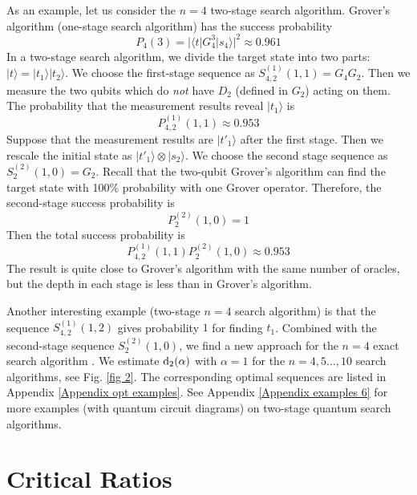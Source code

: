 \documentclass[%
 twocolumn,
 10pt,
 superscriptaddress,
 longbibliography,
 amsmath,amssymb,
 aps,
 pra,
floatfix,
]{revtex4-1}
\begin{document}
As an example, let us consider the $n=4$ two-stage search algorithm. Grover's algorithm (one-stage search algorithm) has the success probability
\begin{equation}
	P_4(3)=|\langle t|G_4^3|s_4\rangle|^2\approx 0.961
\end{equation}
In a two-stage search algorithm, we divide the target state into two parts: $|t\rangle=|t_1\rangle|t_2\rangle$. We choose the first-stage sequence as $S^{(1)}_{4,2}(1,1)=G_4 G_2$. Then we measure the two qubits which do \textit{not} have $D_2$ (defined in $G_2$) acting on them. The probability that the measurement results reveal $|t_1\rangle$ is
\begin{equation}
	P^{(1)}_{4,2}(1,1)\approx 0.953
\end{equation}
Suppose that the measurement results are $|t'_1\rangle$ after the first stage. Then we rescale the initial state as $|t'_1\rangle\otimes|s_2\rangle$. We choose the second stage sequence as $S^{(2)}_{2}(1,0)=G_2$. Recall that the two-qubit Grover's algorithm can find the target state with 100\% probability with one Grover operator. Therefore, the second-stage success probability is
\begin{equation}
	P^{(2)}_{2}(1,0)=1
\end{equation}
Then the total success probability is
\begin{equation}
	P^{(1)}_{4,2}(1,1)P^{(2)}_{2}(1,0)\approx 0.953
\end{equation}
The result is quite close to Grover's algorithm with the same number of oracles, but the depth in each stage is less than in Grover's algorithm.

Another interesting example (two-stage $n=4$ search algorithm) is that the sequence $S^{(1)}_{4,2}(1,2)$ gives probability $1$ for finding $t_1$. Combined with the second-stage sequence $S^{(2)}_{2}(1,0)$, we find a new approach for the $n=4$ exact search algorithm \cite{Diao10}. We estimate $\text d_2(\alpha)$ with $\alpha=1$ for the $n=4,5\ldots,10$ search algorithms, see Fig. \ref{fig 2}. The corresponding optimal sequences are listed in Appendix \ref{Appendix opt examples}. See Appendix \ref{Appendix examples 6} for more examples (with quantum circuit diagrams) on two-stage quantum search algorithms.

\section{\label{sec:alpha}Critical Ratios}
\end{document}
